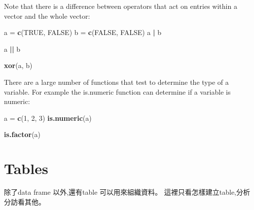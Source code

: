 \documentclass[]{book}
\newenvironment{Shaded}{\begin{snugshade}}{\end{snugshade}}
\newcommand{\KeywordTok}[1]{\textcolor[rgb]{0.13,0.29,0.53}{\textbf{#1}}}
\newcommand{\DecValTok}[1]{\textcolor[rgb]{0.00,0.00,0.81}{#1}}
\newcommand{\StringTok}[1]{\textcolor[rgb]{0.31,0.60,0.02}{#1}}
\newcommand{\OtherTok}[1]{\textcolor[rgb]{0.56,0.35,0.01}{#1}}
\newcommand{\OperatorTok}[1]{\textcolor[rgb]{0.81,0.36,0.00}{\textbf{#1}}}
\newcommand{\NormalTok}[1]{#1}
\theoremstyle{definition}
\theoremstyle{definition}
\theoremstyle{definition}
\theoremstyle{remark}
\begin{document}
Note that there is a difference between operators that act on entries
within a vector and the whole vector:

\begin{Shaded}
\begin{Highlighting}[]
\NormalTok{a =}\StringTok{ }\KeywordTok{c}\NormalTok{(}\OtherTok{TRUE}\NormalTok{, }\OtherTok{FALSE}\NormalTok{)}
\NormalTok{b =}\StringTok{ }\KeywordTok{c}\NormalTok{(}\OtherTok{FALSE}\NormalTok{, }\OtherTok{FALSE}\NormalTok{)}
\NormalTok{a }\OperatorTok{|}\StringTok{ }\NormalTok{b}
\end{Highlighting}
\end{Shaded}

\begin{Shaded}
\begin{Highlighting}[]
\NormalTok{a }\OperatorTok{||}\StringTok{ }\NormalTok{b}
\end{Highlighting}
\end{Shaded}

\begin{Shaded}
\begin{Highlighting}[]
\KeywordTok{xor}\NormalTok{(a, b)}
\end{Highlighting}
\end{Shaded}

There are a large number of functions that test to determine the type of
a variable. For example the is.numeric function can determine if a
variable is numeric:

\begin{Shaded}
\begin{Highlighting}[]
\NormalTok{a =}\StringTok{ }\KeywordTok{c}\NormalTok{(}\DecValTok{1}\NormalTok{, }\DecValTok{2}\NormalTok{, }\DecValTok{3}\NormalTok{)}
\KeywordTok{is.numeric}\NormalTok{(a)}
\end{Highlighting}
\end{Shaded}

\begin{Shaded}
\begin{Highlighting}[]
\KeywordTok{is.factor}\NormalTok{(a)}
\end{Highlighting}
\end{Shaded}

\section{Tables}\label{tables}

除了data frame 以外,還有table 可以用來組織資料。
這裡只看怎樣建立table,分析分訪看其他。
\end{document}
